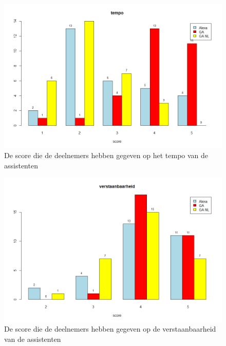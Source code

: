 \begin{figure}[h]
    \includegraphics[width=0.9\linewidth]{../onderzoek/onderzoeksresultaten/vergelijking_assistenten_per_eigenschap/barplot/barplot_score_tempo}
    \caption{De score die de deelnemers hebben gegeven op het tempo van de assistenten}
    \label{fig:barplot-tempo}
\end{figure}

\begin{figure}[h]
    \includegraphics[width=0.9\linewidth]{../onderzoek/onderzoeksresultaten/vergelijking_assistenten_per_eigenschap/barplot/barplot_score_verstaanbaarheid}
    \caption{De score die de deelnemers hebben gegeven op de verstaanbaarheid van de assistenten}
    \label{fig:barplot-verstaanbaarheid}
\end{figure}

